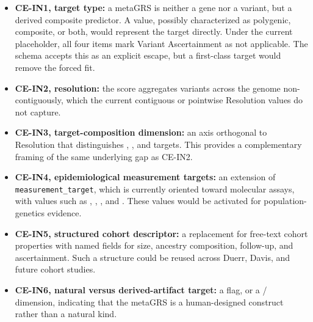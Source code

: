 \begin{itemize}
  \item \textbf{CE-IN1,  target type:} a metaGRS is
  neither a gene nor a variant, but a derived composite predictor. A
   value, possibly characterized as polygenic, composite, or
  both, would represent the target directly. Under the current
   placeholder, all four items mark Variant Ascertainment
  as not applicable. The schema accepts this as an explicit escape, but a
  first-class  target would remove the forced fit.

  \item \textbf{CE-IN2,  resolution:} the
  score aggregates variants across the genome non-contiguously, which the
  current contiguous or pointwise Resolution values do not capture.

  \item \textbf{CE-IN3, target-composition dimension:} an axis orthogonal
  to Resolution that distinguishes ,
  , and  targets. This provides a
  complementary framing of the same underlying gap as CE-IN2.

  \item \textbf{CE-IN4, epidemiological measurement targets:} an
  extension of \texttt{measurement\_target}, which is currently oriented
  toward molecular assays, with values such as ,
  , , and . These values
  would be activated for population-genetics evidence.

  \item \textbf{CE-IN5, structured cohort descriptor:} a replacement for
  free-text cohort properties with named fields for size, ancestry
  composition, follow-up, and ascertainment. Such a structure could be
  reused across Duerr, Davis, and future cohort studies.

  \item \textbf{CE-IN6, natural versus derived-artifact target:} a flag,
  or a / dimension, indicating that the
  metaGRS is a human-designed construct rather than a natural kind.
\end{itemize}

